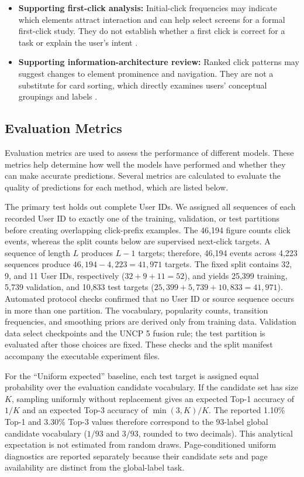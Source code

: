 \documentclass[sn-mathphys-num, Numbered]{sn-jnl}%
\theoremstyle{thmstyleone}%
\theoremstyle{thmstyletwo}%
\theoremstyle{thmstylethree}%
\begin{document}
\begin{itemize} \item \textbf{Supporting first-click analysis:} Initial-click frequencies may indicate which elements attract interaction and can help select screens for a formal first-click study. They do not establish whether a first click is correct for a task or explain the user's intent \cite{falkowska2022replication}.
	\item \textbf{Supporting information-architecture review:}
	Ranked click patterns may suggest changes to element prominence and navigation. They are not a substitute for card sorting, which directly examines users' conceptual groupings and labels \cite{nawaz2012comparison}.
	
\end{itemize}


\subsection{Evaluation Metrics}
Evaluation metrics are used to assess the performance of different models. These metrics help determine how well the models have performed and whether they can make accurate predictions. Several metrics are calculated to evaluate the quality of predictions for each method, which are listed below.

The primary test holds out complete User IDs. We assigned all sequences of each recorded User ID to exactly one of the training, validation, or test partitions before creating overlapping click-prefix examples. The 46,194 figure counts click events, whereas the split counts below are supervised next-click targets. A sequence of length $L$ produces $L-1$ targets; therefore, 46,194 events across 4,223 sequences produce $46{,}194-4{,}223=41{,}971$ targets. The fixed split contains 32, 9, and 11 User IDs, respectively ($32+9+11=52$), and yields 25,399 training, 5,739 validation, and 10,833 test targets ($25{,}399+5{,}739+10{,}833=41{,}971$). Automated protocol checks confirmed that no User ID or source sequence occurs in more than one partition. The vocabulary, popularity counts, transition frequencies, and smoothing priors are derived only from training data. Validation data select checkpoints and the UNCP 5 fusion rule; the test partition is evaluated after those choices are fixed. These checks and the split manifest accompany the executable experiment files.

For the ``Uniform expected'' baseline, each test target is assigned equal probability over the evaluation candidate vocabulary. If the candidate set has size $K$, sampling uniformly without replacement gives an expected Top-1 accuracy of $1/K$ and an expected Top-3 accuracy of $\min(3,K)/K$. The reported 1.10\% Top-1 and 3.30\% Top-3 values therefore correspond to the 93-label global candidate vocabulary ($1/93$ and $3/93$, rounded to two decimals). This analytical expectation is not estimated from random draws. Page-conditioned uniform diagnostics are reported separately because their candidate sets and page availability are distinct from the global-label task.
\end{document}
